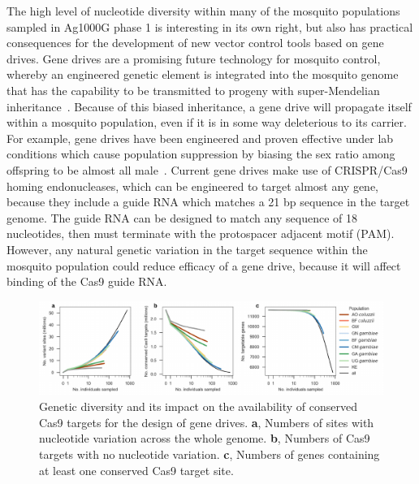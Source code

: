 \begin{refsection}
The high level of nucleotide diversity within many of the mosquito populations sampled in Ag1000G phase 1 is interesting in its own right, but also has practical consequences for the development of new vector control tools based on gene drives.
%
Gene drives are a promising future technology for mosquito control, whereby an engineered genetic element is integrated into the mosquito genome that has the capability to be transmitted to progeny with super-Mendelian inheritance~\parencite{Burt2003}.
%
Because of this biased inheritance, a gene drive will propagate itself within a mosquito population, even if it is in some way deleterious to its carrier.
%
For example, gene drives have been engineered and proven effective under lab conditions which cause population suppression by biasing the sex ratio among offspring to be almost all male~\parencite{Kyrou2018}.
%
Current gene drives make use of CRISPR/Cas9 homing endonucleases, which can be engineered to target almost any gene, because they include a guide RNA which matches a 21 bp sequence in the target genome.
%
The guide RNA can be designed to match any sequence of 18 nucleotides, then must terminate with the protospacer adjacent motif (PAM).
%
However, any natural genetic variation in the target sequence within the mosquito population could reduce efficacy of a gene drive, because it will affect binding of the Cas9 guide RNA.
%


\begin{figure}[t!]
\centering
\includegraphics[width=1.1\textwidth,center]{artwork/chapter4/cas9_targets.pdf}
\caption{Genetic diversity and its impact on the availability of conserved Cas9 targets for the design of gene drives.
%
\textbf{a}, Numbers of sites with nucleotide variation across the whole genome.
%
\textbf{b}, Numbers of Cas9 targets with no nucleotide variation.
%
\textbf{c}, Numbers of genes containing at least one conserved Cas9 target site.
%
}
\label{fig:cas9}
\end{figure}



\end{refsection}
